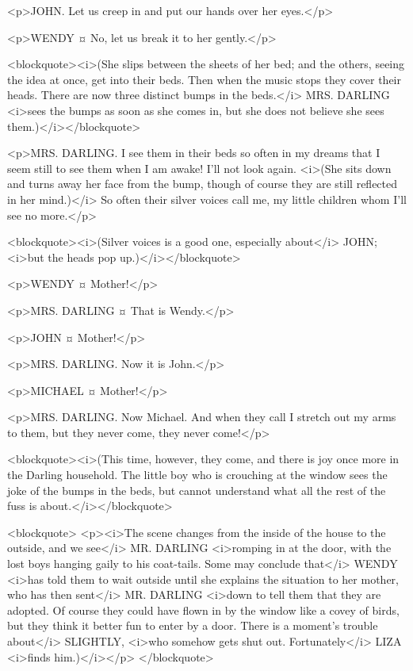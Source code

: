 <p>JOHN. Let us creep in and put our hands over her eyes.</p>

<p>WENDY ¤
No, let us break it to her gently.</p>

<blockquote><i>(She slips between the sheets of her bed; and the others, seeing the idea at once, get into their beds. Then when the music stops they cover their heads. There are now three distinct bumps in the beds.</i> MRS. DARLING <i>sees the bumps as soon as she comes in, but she does not believe she sees them.)</i></blockquote>

<p>MRS. DARLING. I see them in their beds so often in my dreams that I seem still to see them when I am awake! I'll not look again. <i>(She sits down and turns away her face from the bump, though of course they are still reflected in her mind.)</i> So often their silver voices call me, my little children whom I'll see no more.</p>

<blockquote><i>(Silver voices is a good one, especially about</i> JOHN; <i>but the heads pop up.)</i></blockquote>

<p>WENDY ¤
Mother!</p>

<p>MRS. DARLING ¤
That is Wendy.</p>

<p>JOHN ¤
Mother!</p>

<p>MRS. DARLING. Now it is John.</p>

<p>MICHAEL ¤
Mother!</p>

<p>MRS. DARLING. Now Michael. And when they call I stretch out my arms to them, but they never come, they never come!</p>

<blockquote><i>(This time, however, they come, and there is joy once more in the Darling household. The little boy who is crouching at the window sees the joke of the bumps in the beds, but cannot understand what all the rest of the fuss is about.</i></blockquote>

<blockquote> <p><i>The scene changes from the inside of the house to the outside, and we see</i> MR. DARLING <i>romping in at the door, with the lost boys hanging gaily to his coat-tails. Some may conclude that</i> WENDY <i>has told them to wait outside until she explains the situation to her mother, who has then sent</i> MR. DARLING <i>down to tell them that they are adopted. Of course they could have flown in by the window like a covey of birds, but they think it better fun to enter by a door. There is a moment's trouble about</i> SLIGHTLY, <i>who somehow gets shut out. Fortunately</i> LIZA <i>finds him.)</i></p> </blockquote>

